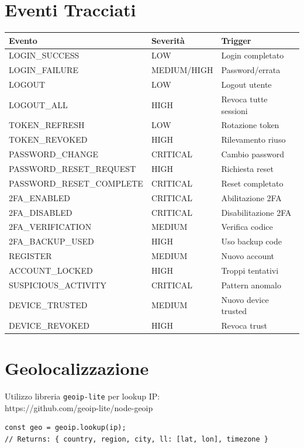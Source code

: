 \documentclass[12pt,a4paper]{report}
\begin{document}
\section{Eventi Tracciati}

\begin{longtable}{@{}lll@{}}
\toprule
\textbf{Evento} & \textbf{Severità} & \textbf{Trigger} \\
\midrule
\endhead
LOGIN\_SUCCESS & LOW & Login completato \\
LOGIN\_FAILURE & MEDIUM/HIGH & Password/errata \\
LOGOUT & LOW & Logout utente \\
LOGOUT\_ALL & HIGH & Revoca tutte sessioni \\
TOKEN\_REFRESH & LOW & Rotazione token \\
TOKEN\_REVOKED & HIGH & Rilevamento riuso \\
PASSWORD\_CHANGE & CRITICAL & Cambio password \\
PASSWORD\_RESET\_REQUEST & HIGH & Richiesta reset \\
PASSWORD\_RESET\_COMPLETE & CRITICAL & Reset completato \\
2FA\_ENABLED & CRITICAL & Abilitazione 2FA \\
2FA\_DISABLED & CRITICAL & Disabilitazione 2FA \\
2FA\_VERIFICATION & MEDIUM & Verifica codice \\
2FA\_BACKUP\_USED & HIGH & Uso backup code \\
REGISTER & MEDIUM & Nuovo account \\
ACCOUNT\_LOCKED & HIGH & Troppi tentativi \\
SUSPICIOUS\_ACTIVITY & CRITICAL & Pattern anomalo \\
DEVICE\_TRUSTED & MEDIUM & Nuovo device trusted \\
DEVICE\_REVOKED & HIGH & Revoca trust \\
\bottomrule
\end{longtable}

\section{Geolocalizzazione}

Utilizzo libreria \texttt{geoip-lite} per lookup IP:\\ https://github.com/geoip-lite/node-geoip

\begin{lstlisting}[caption={Geolocation Lookup}]
const geo = geoip.lookup(ip);
// Returns: { country, region, city, ll: [lat, lon], timezone }
\end{lstlisting}
\end{document}
